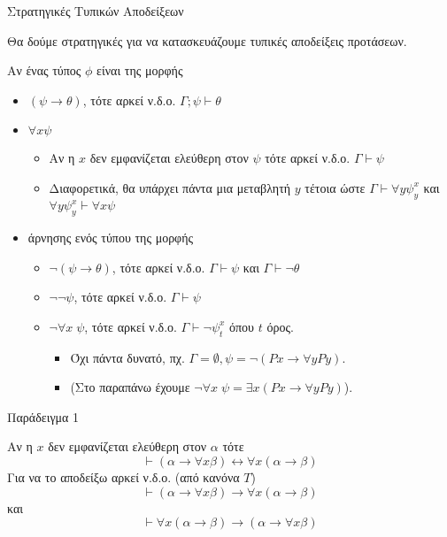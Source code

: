 \documentclass{beamer}
\begin{document}
\begin{frame}{Στρατηγικές Τυπικών Αποδείξεων}
  \begin{block}{}
    Θα δούμε στρατηγικές για να κατασκευάζουμε τυπικές αποδείξεις προτάσεων.
  \end{block}
  \begin{block}{}
    Αν ένας τύπος $\phi$ είναι της μορφής
    \begin{itemize}
      \item $(\psi \rightarrow \theta)$, τότε αρκεί ν.δ.ο. $\Gamma ; \psi \vdash \theta$
      \item $\forall x \psi$
        \begin{itemize}
          \item Αν η $x$ δεν εμφανίζεται ελεύθερη στον $\psi$ τότε αρκεί ν.δ.ο. $\Gamma \vdash \psi$
          \item Διαφορετικά, θα υπάρχει πάντα μια μεταβλητή $y$ τέτοια ώστε $\Gamma \vdash \forall y \psi_y^x$ και $\forall y \psi_y^x \vdash \forall x \psi$
        \end{itemize}
      \item άρνησης ενός τύπου της μορφής
        \begin{itemize}
          \item $\neg(\psi \rightarrow \theta)$, τότε αρκεί ν.δ.ο. $\Gamma \vdash \psi$ και $\Gamma \vdash \neg\theta$
          \item $\neg\neg\psi$, τότε αρκεί ν.δ.ο. $\Gamma \vdash \psi$
          \item $\neg\forall x \; \psi$, τότε αρκεί ν.δ.ο. $\Gamma \vdash \neg\psi_t^x$ όπου $t$ όρος.
            \begin{itemize}
              \item Όχι πάντα δυνατό, πχ. $\Gamma = \emptyset, \psi = \neg(Px \rightarrow \forall y Py)$.
          \item (Στο παραπάνω έχουμε $\neg\forall x \; \psi = \exists x (Px \rightarrow \forall y Py)$).
            \end{itemize}
        \end{itemize}
    \end{itemize}
  \end{block}
\end{frame}

\begin{frame}{Παράδειγμα 1}
  \begin{block}{}
    Αν η $x$ δεν εμφανίζεται ελεύθερη στον $\alpha$ τότε
    \[
      \vdash (\alpha \rightarrow \forall x \beta) \leftrightarrow \forall x (\alpha \rightarrow \beta)
    \]
    Για να το αποδείξω αρκεί ν.δ.ο. (από κανόνα $T$)
    \[
      \vdash (\alpha \rightarrow \forall x \beta) \rightarrow \forall x (\alpha \rightarrow \beta)
    \]
    και
    \[
      \vdash \forall x (\alpha \rightarrow \beta) \rightarrow (\alpha \rightarrow \forall x \beta)
    \]
  \end{block}
\end{frame}
\end{document}
